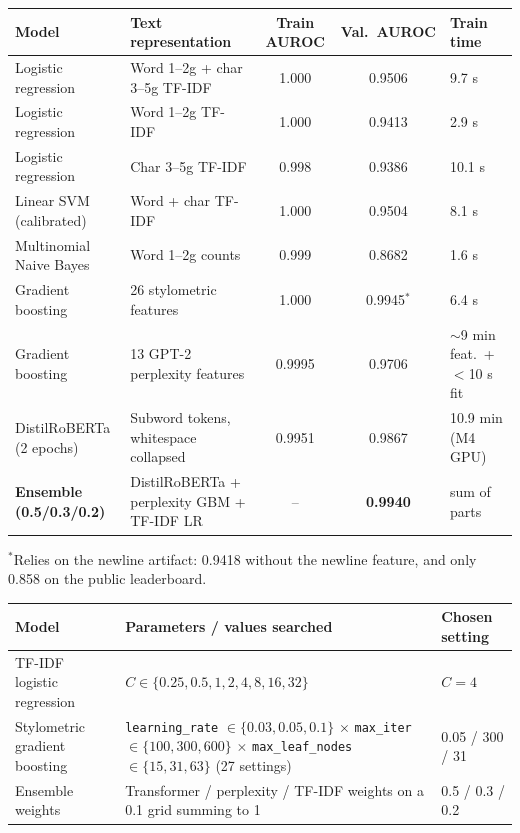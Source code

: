 \begin{center}
\footnotesize
\begin{tabular}{|p{3.0cm}|p{4.2cm}|c|c|p{2.5cm}|}
\hline
\textbf{Model} & \textbf{Text representation} & \textbf{Train AUROC} & \textbf{Val.\ AUROC} & \textbf{Train time} \\
\hline
Logistic regression & Word 1--2g + char 3--5g TF-IDF & 1.000 & 0.9506 & 9.7 s \\
Logistic regression & Word 1--2g TF-IDF & 1.000 & 0.9413 & 2.9 s \\
Logistic regression & Char 3--5g TF-IDF & 0.998 & 0.9386 & 10.1 s \\
Linear SVM (calibrated) & Word + char TF-IDF & 1.000 & 0.9504 & 8.1 s \\
Multinomial Naive Bayes & Word 1--2g counts & 0.999 & 0.8682 & 1.6 s \\
Gradient boosting & 26 stylometric features & 1.000 & 0.9945$^{*}$ & 6.4 s \\
Gradient boosting & 13 GPT-2 perplexity features & 0.9995 & 0.9706 & $\sim$9 min feat.\ + $<$10 s fit \\
DistilRoBERTa (2 epochs) & Subword tokens, whitespace collapsed & 0.9951 & 0.9867 & 10.9 min (M4 GPU) \\
\textbf{Ensemble (0.5/0.3/0.2)} & DistilRoBERTa + perplexity GBM + TF-IDF LR & -- & \textbf{0.9940} & sum of parts \\
\hline
\end{tabular}
\end{center}
{\footnotesize $^{*}$Relies on the newline artifact: 0.9418 without the newline
feature, and only 0.858 on the public leaderboard.}

\begin{center}
\small
\begin{tabular}{|l|p{8.2cm}|l|}
\hline
\textbf{Model} & \textbf{Parameters / values searched} & \textbf{Chosen setting} \\
\hline
TF-IDF logistic regression & $C \in \{0.25, 0.5, 1, 2, 4, 8, 16, 32\}$ & $C = 4$ \\
Stylometric gradient boosting & \texttt{learning\_rate} $\in \{0.03, 0.05, 0.1\}$ $\times$
\texttt{max\_iter} $\in \{100, 300, 600\}$ $\times$ \texttt{max\_leaf\_nodes} $\in \{15, 31, 63\}$
(27 settings) & 0.05 / 300 / 31 \\
Ensemble weights & Transformer / perplexity / TF-IDF weights on a 0.1 grid summing to 1 & 0.5 / 0.3 / 0.2 \\
\hline
\end{tabular}
\end{center}

